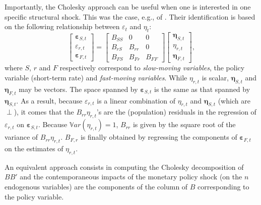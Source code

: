 \documentclass[
  12pt,
]{book}
\theoremstyle{definition}
\theoremstyle{definition}
\theoremstyle{definition}
\theoremstyle{definition}
\theoremstyle{remark}
\begin{document}
Importantly, the Cholesky approach can be useful when one is interested in one specific structural shock. This was the case, e.g., of \citet{Christiano_Eichenbaum_Evans_1996}. Their identification is based on the following relationship between \(\varepsilon_t\) and \(\eta_t\):
\[
\left[\begin{array}{c}
\boldsymbol\varepsilon_{S,t}\\
\varepsilon_{r,t}\\
\boldsymbol\varepsilon_{F,t}
\end{array}\right] =
\left[\begin{array}{ccc}
B_{SS} & 0 & 0 \\
B_{rS} & B_{rr} & 0 \\
B_{FS} & B_{Fr} & B_{FF}
\end{array}\right]
\left[\begin{array}{c}
\boldsymbol\eta_{S,t}\\
\eta_{r,t}\\
\boldsymbol\eta_{F,t}
\end{array}\right],
\]
where \(S\), \(r\) and \(F\) respectively correspond to \emph{slow-moving variables}, the policy variable (short-term rate) and \emph{fast-moving variables}. While \(\eta_{r,t}\) is scalar, \(\boldsymbol\eta_{S,t}\) and \(\boldsymbol\eta_{F,t}\) may be vectors. The space spanned by \(\boldsymbol\varepsilon_{S,t}\) is the same as that spanned by \(\boldsymbol\eta_{S,t}\). As a result, because \(\varepsilon_{r,t}\) is a linear combination of \(\eta_{r,t}\) and \(\boldsymbol\eta_{S,t}\) (which are \(\perp\)), it comes that the \(B_{rr}\eta_{r,t}\)'s are the (population) residuals in the regression of \(\varepsilon_{r,t}\) on \(\boldsymbol\varepsilon_{S,t}\). Because \(\mathbb{V}ar(\eta_{r,t})=1\), \(B_{rr}\) is given by the square root of the variance of \(B_{rr}\eta_{r,t}\). \(B_{F,r}\) is finally obtained by regressing the components of \(\boldsymbol\varepsilon_{F,t}\) on the estimates of \(\eta_{r,t}\).

An equivalent approach consists in computing the Cholesky decomposition of \(BB'\) and the contemporaneous impacts of the monetary policy shock (on the \(n\) endogenous variables) are the components of the column of \(B\) corresponding to the policy variable.
\end{document}
